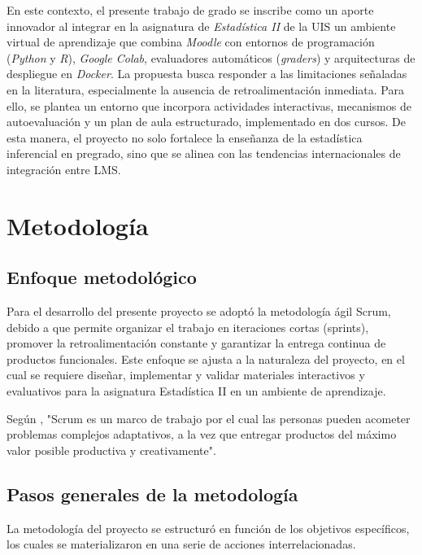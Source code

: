 \documentclass[letter,oneside,12pt,spanish]{report}
\begin{document}
En este contexto, el presente trabajo de grado se inscribe como un aporte innovador al 
integrar en la asignatura de \textit{Estadística II} de la UIS un ambiente virtual de aprendizaje 
que combina \textit{Moodle} con entornos de programación (\textit{Python} y \textit{R}), 
\textit{Google Colab}, evaluadores automáticos (\textit{graders}) y arquitecturas de despliegue en 
\textit{Docker}. La propuesta busca responder a las limitaciones señaladas en la literatura, 
especialmente la ausencia de retroalimentación inmediata. Para ello, se plantea un entorno que 
incorpora actividades interactivas, mecanismos de autoevaluación y un plan de aula estructurado, 
implementado en dos cursos. De esta manera, el proyecto no solo fortalece la enseñanza de la 
estadística inferencial en pregrado, sino que se alinea con las tendencias internacionales de 
integración entre LMS.

\newpage

\chapter{Metodología}

\section{Enfoque metodológico}


Para el desarrollo del presente proyecto se adoptó la metodología ágil Scrum, debido a que permite organizar el trabajo en iteraciones cortas (sprints), promover la retroalimentación constante y garantizar la entrega continua de productos funcionales. Este enfoque se ajusta a la naturaleza del proyecto, en el cual se requiere diseñar, implementar y validar materiales interactivos y evaluativos para la asignatura Estadística II en un ambiente de aprendizaje.

Según \cite{schwaber2013scrum}, "Scrum es un marco de trabajo por el cual las personas pueden acometer problemas complejos adaptativos, a la vez que entregar productos del máximo valor posible productiva y creativamente".


\section{Pasos generales de la metodología}

La metodología del proyecto se estructuró en función de los objetivos específicos, los cuales se materializaron en una serie de acciones interrelacionadas.
\end{document}
